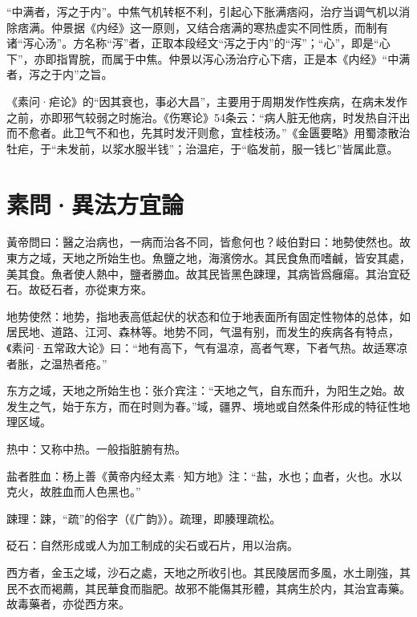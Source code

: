 \documentclass[draft,12pt]{ctexbook}
\begin{document}
“中满者，泻之于内”。中焦气机转枢不利，引起心下胀满痞闷，治疗当调气机以消除痞满。仲景据《内经》这一原则，又结合痞满的寒热虚实不同性质，而制有诸“泻心汤”。方名称“泻”者，正取本段经文“泻之于内”的“泻”；“心”，即是“心下”，亦即指胃脘，而属于中焦。仲景以泻心汤治疗心下痞，正是本《内经》“中满者，泻之于内”之旨。

《素问·疟论》的“因其衰也，事必大昌”，主要用于周期发作性疾病，在病未发作之前，亦即邪气较弱之时施治。《伤寒论》54条云：“病人脏无他病，时发热自汗出而不愈者。此卫气不和也，先其时发汗则愈，宜桂枝汤。”《金匮要略》用蜀漆散治牡疟，于“未发前，以浆水服半钱”；治温疟，于“临发前，服一钱匕”皆属此意。

\section{素問·異法方宜論}%


\begin{yuanwen}
黃帝問曰：醫之治病也，一病而治各不同，皆愈何也？岐伯對曰：地勢使然也。故東方之域，天地之所始生也。魚鹽之地，海濱傍水。其民食魚而嗜鹹，皆安其處，美其食。魚者使人熱中，鹽者勝血。故其民皆黑色踈理，其病皆爲癰瘍。其治宜砭石。故砭石者，亦從東方來。
\end{yuanwen}


\begin{jiaozhu}
	\item 地势使然：地势，指地表高低起伏的状态和位于地表面所有固定性物体的总体，如居民地、道路、江河、森林等。地势不同，气温有别，而发生的疾病各有特点，《素问·五常政大论》曰：“地有高下，气有温凉，高者气寒，下者气热。故适寒凉者胀，之温热者疮。”
	\item 东方之域，天地之所始生也：张介宾注：“天地之气，自东而升，为阳生之始。故发生之气，始于东方，而在时则为春。”域，疆界、境地或自然条件形成的特征性地理区域。
	\item 热中：又称中热。一般指脏腑有热。
	\item 盐者胜血：杨上善《黄帝内经太素·知方地》注：“盐，水也；血者，火也。水以克火，故胜血而人色黑也。”
	\item 踈理：踈，“疏”的俗字（《广韵》）。疏理，即腠理疏松。
	\item 砭石：自然形成或人为加工制成的尖石或石片，用以治病。
\end{jiaozhu}


\begin{yuanwen}
西方者，金玉之域，沙石之處，天地之所收引也。其民陵居而多風，水土剛強，其民不衣而褐薦，其民華食而脂肥。故邪不能傷其形體，其病生於内，其治宜毒藥。故毒藥者，亦從西方來。
\end{yuanwen}
\end{document}
